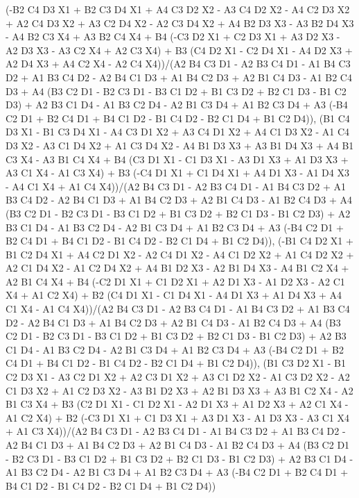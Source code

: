 \documentclass[11pt, landscape]{article}
\begin{document}
{(-B2 C4 D3 X1 + B2 C3 D4 X1 + A4 C3 D2 X2 - A3 C4 D2 X2 - 
    A4 C2 D3 X2 + A2 C4 D3 X2 + A3 C2 D4 X2 - A2 C3 D4 X2 + 
    A4 B2 D3 X3 - A3 B2 D4 X3 - A4 B2 C3 X4 + A3 B2 C4 X4 + 
    B4 (-C3 D2 X1 + C2 D3 X1 + A3 D2 X3 - A2 D3 X3 - A3 C2 X4 + 
       A2 C3 X4) + 
    B3 (C4 D2 X1 - C2 D4 X1 - A4 D2 X3 + A2 D4 X3 + A4 C2 X4 - 
       A2 C4 X4))/(A2 B4 C3 D1 - A2 B3 C4 D1 - A1 B4 C3 D2 + 
    A1 B3 C4 D2 - A2 B4 C1 D3 + A1 B4 C2 D3 + A2 B1 C4 D3 - 
    A1 B2 C4 D3 + 
    A4 (B3 C2 D1 - B2 C3 D1 - B3 C1 D2 + B1 C3 D2 + B2 C1 D3 - 
       B1 C2 D3) + A2 B3 C1 D4 - A1 B3 C2 D4 - A2 B1 C3 D4 + 
    A1 B2 C3 D4 + 
    A3 (-B4 C2 D1 + B2 C4 D1 + B4 C1 D2 - B1 C4 D2 - B2 C1 D4 + 
       B1 C2 D4)), (B1 C4 D3 X1 - B1 C3 D4 X1 - A4 C3 D1 X2 + 
    A3 C4 D1 X2 + A4 C1 D3 X2 - A1 C4 D3 X2 - A3 C1 D4 X2 + 
    A1 C3 D4 X2 - A4 B1 D3 X3 + A3 B1 D4 X3 + A4 B1 C3 X4 - 
    A3 B1 C4 X4 + 
    B4 (C3 D1 X1 - C1 D3 X1 - A3 D1 X3 + A1 D3 X3 + A3 C1 X4 - 
       A1 C3 X4) + 
    B3 (-C4 D1 X1 + C1 D4 X1 + A4 D1 X3 - A1 D4 X3 - A4 C1 X4 + 
       A1 C4 X4))/(A2 B4 C3 D1 - A2 B3 C4 D1 - A1 B4 C3 D2 + 
    A1 B3 C4 D2 - A2 B4 C1 D3 + A1 B4 C2 D3 + A2 B1 C4 D3 - 
    A1 B2 C4 D3 + 
    A4 (B3 C2 D1 - B2 C3 D1 - B3 C1 D2 + B1 C3 D2 + B2 C1 D3 - 
       B1 C2 D3) + A2 B3 C1 D4 - A1 B3 C2 D4 - A2 B1 C3 D4 + 
    A1 B2 C3 D4 + 
    A3 (-B4 C2 D1 + B2 C4 D1 + B4 C1 D2 - B1 C4 D2 - B2 C1 D4 + 
       B1 C2 D4)), (-B1 C4 D2 X1 + B1 C2 D4 X1 + A4 C2 D1 X2 - 
    A2 C4 D1 X2 - A4 C1 D2 X2 + A1 C4 D2 X2 + A2 C1 D4 X2 - 
    A1 C2 D4 X2 + A4 B1 D2 X3 - A2 B1 D4 X3 - A4 B1 C2 X4 + 
    A2 B1 C4 X4 + 
    B4 (-C2 D1 X1 + C1 D2 X1 + A2 D1 X3 - A1 D2 X3 - A2 C1 X4 + 
       A1 C2 X4) + 
    B2 (C4 D1 X1 - C1 D4 X1 - A4 D1 X3 + A1 D4 X3 + A4 C1 X4 - 
       A1 C4 X4))/(A2 B4 C3 D1 - A2 B3 C4 D1 - A1 B4 C3 D2 + 
    A1 B3 C4 D2 - A2 B4 C1 D3 + A1 B4 C2 D3 + A2 B1 C4 D3 - 
    A1 B2 C4 D3 + 
    A4 (B3 C2 D1 - B2 C3 D1 - B3 C1 D2 + B1 C3 D2 + B2 C1 D3 - 
       B1 C2 D3) + A2 B3 C1 D4 - A1 B3 C2 D4 - A2 B1 C3 D4 + 
    A1 B2 C3 D4 + 
    A3 (-B4 C2 D1 + B2 C4 D1 + B4 C1 D2 - B1 C4 D2 - B2 C1 D4 + 
       B1 C2 D4)), (B1 C3 D2 X1 - B1 C2 D3 X1 - A3 C2 D1 X2 + 
    A2 C3 D1 X2 + A3 C1 D2 X2 - A1 C3 D2 X2 - A2 C1 D3 X2 + 
    A1 C2 D3 X2 - A3 B1 D2 X3 + A2 B1 D3 X3 + A3 B1 C2 X4 - 
    A2 B1 C3 X4 + 
    B3 (C2 D1 X1 - C1 D2 X1 - A2 D1 X3 + A1 D2 X3 + A2 C1 X4 - 
       A1 C2 X4) + 
    B2 (-C3 D1 X1 + C1 D3 X1 + A3 D1 X3 - A1 D3 X3 - A3 C1 X4 + 
       A1 C3 X4))/(A2 B4 C3 D1 - A2 B3 C4 D1 - A1 B4 C3 D2 + 
    A1 B3 C4 D2 - A2 B4 C1 D3 + A1 B4 C2 D3 + A2 B1 C4 D3 - 
    A1 B2 C4 D3 + 
    A4 (B3 C2 D1 - B2 C3 D1 - B3 C1 D2 + B1 C3 D2 + B2 C1 D3 - 
       B1 C2 D3) + A2 B3 C1 D4 - A1 B3 C2 D4 - A2 B1 C3 D4 + 
    A1 B2 C3 D4 + 
    A3 (-B4 C2 D1 + B2 C4 D1 + B4 C1 D2 - B1 C4 D2 - B2 C1 D4 + 
       B1 C2 D4))}
\end{document}
